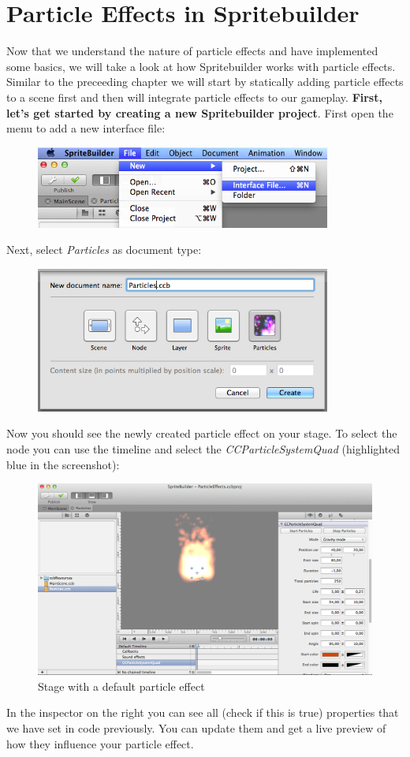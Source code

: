 \documentclass{scrreprt}
\begin{document}
\section{Particle Effects in Spritebuilder}
Now that we understand the nature of particle effects and have implemented some
basics, we will take a look at how Spritebuilder works with particle effects.
Similar to the preceeding chapter we will start by statically adding particle
effects to a scene first and then will integrate particle effects
to our gameplay.
\textbf{First, let's get started by creating a new Spritebuilder project}.
First open the menu to add a new interface file: 
\begin{figure}[H]
		\centering
		\includegraphics[width=275pt]{images/particles/Spritebuilder_ParticleEffect_Menu1.png}   
\end{figure}
Next, select \textit{Particles} as document type:
\begin{figure}[H]
		\centering
		\includegraphics[width=275pt]{images/particles/Spritebuilder_ParticleEffect_Menu2.png}   
\end{figure}
Now you should see the newly created particle effect on your stage. To select
the node you can use the timeline and select the \textit{CCParticleSystemQuad}
(highlighted blue in the screenshot):
\begin{figure}[H]
		\centering
		\includegraphics[width=375pt]{images/particles/Spritebuilder_ParticleEffect_CCB.png}   
		\caption{Stage with a default particle effect}
\end{figure}
In the inspector on the right you can see all (check if this is true) properties
that we have set in code previously. You can update them and get a live preview
of how they influence your particle effect. 
\end{document}
